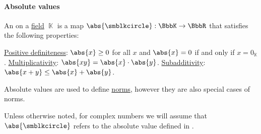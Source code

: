 \paragraph{Absolute values}

\begin{definition}\label{def:absolute_value}
  An  on a \hyperref[def:field]{field} \( \BbbK \) is a map \( \abs{\anon}: \BbbK \to \BbbR \) that satisfies the following properties:
  \begin{thmenum}
     \hyperref[def:real_function_definiteness]{Positive definiteness}: \( \abs{x} \geq 0 \) for all \( x \) and \( \abs{x} = 0 \) if and only if \( x = 0_\BbbK \).
     \hyperref[def:multiplicative_function]{Multiplicativity}: \( \abs{xy} = \abs{x} \cdot \abs{y} \).
     \hyperref[def:additive_function/sub]{Subadditivity}: \( \abs{x + y} \leq \abs{x} + \abs{y} \).
  \end{thmenum}
\end{definition}
\begin{comments}
  \item Absolute values are used to define \hyperref[def:norm]{norms}, however they are also special cases of norms.
  \item Unless otherwise noted, for complex numbers we will assume that \( \abs{\anon} \) refers to the absolute value defined in .
\end{comments}

